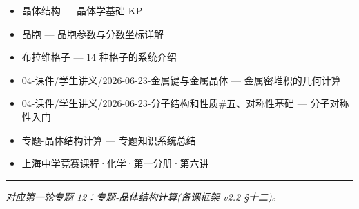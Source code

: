 \documentclass[a4paper,11pt]{ctexart}
\providecommand{\tightlist}{\setlength{\itemsep}{0pt}\setlength{\parskip}{0pt}}
\newcommand{\箭}{\ensuremath{\rightarrow}}
\newcommand{\左箭}{\ensuremath{\leftarrow}}
\newcommand{\上箭}{\ensuremath{\uparrow}}
\newcommand{\下箭}{\ensuremath{\downarrow}}
\newcommand{\衡}{\ensuremath{\rightleftharpoons}}
\newcommand{\双箭}{\ensuremath{\leftrightarrow}}
\newcommand{\约等于}{\ensuremath{\approx}}
\newcommand{\小于等于}{\ensuremath{\leq}}
\newcommand{\大于等于}{\ensuremath{\geq}}
\newcommand{\不等于}{\ensuremath{\neq}}
\newcommand{\西格马}{\ensuremath{\sigma}}
\newcommand{\派}{\ensuremath{\pi}}
\begin{document}
\begin{itemize}
\tightlist
\item
  晶体结构 --- 晶体学基础 KP
\item
  晶胞 --- 晶胞参数与分数坐标详解
\item
  布拉维格子 --- 14 种格子的系统介绍
\item
  04-课件/学生讲义/2026-06-23-金属键与金属晶体 --- 金属密堆积的几何计算
\item
  04-课件/学生讲义/2026-06-23-分子结构和性质\#五、对称性基础 --- 分子对称性入门
\item
  专题-晶体结构计算 --- 专题知识系统总结
\item
  上海中学竞赛课程·化学·第一分册·第六讲
\end{itemize}

\begin{center}\rule{0.5\linewidth}{0.5pt}\end{center}

\emph{对应第一轮专题 12：专题-晶体结构计算(备课框架 v2.2 §十二)。}
\end{document}
